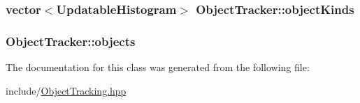 \hypertarget{classObjectTracker_af0583d1c26ddc0e3467aec4e8da18d04}{
\subsubsection[{object\-Kinds}]{\setlength{\rightskip}{0pt plus 5cm}vector$<${\bf \-Updatable\-Histogram}$>$ {\bf \-Object\-Tracker\-::object\-Kinds}}}\label{classObjectTracker_af0583d1c26ddc0e3467aec4e8da18d04}
\hypertarget{classObjectTracker_a5679582add136b19310f601aeaccc29e}{
\subsubsection[{objects}]{ {\bf \-Object\-Tracker\-::objects}}}\label{classObjectTracker_a5679582add136b19310f601aeaccc29e}


\-The documentation for this class was generated from the following file\-:\begin{DoxyCompactItemize}
\item 
include/\hyperlink{ObjectTracking_8hpp}{\-Object\-Tracking.\-hpp}\end{DoxyCompactItemize}

